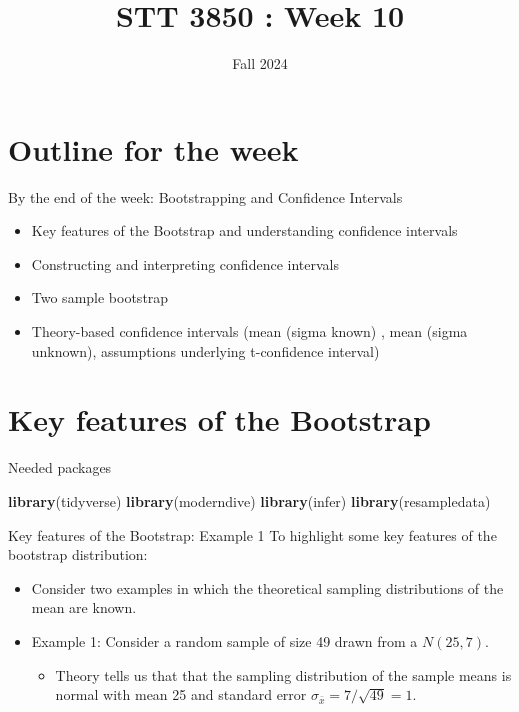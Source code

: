 \documentclass[
  ignorenonframetext,
]{beamer}
\title{STT 3850 : Week 10}
\author{Fall 2024}
\date{}
\institute{Appalachian State University}
\newenvironment{Shaded}{\begin{snugshade}}{\end{snugshade}}
\newcommand{\FunctionTok}[1]{\textcolor[rgb]{0.13,0.29,0.53}{\textbf{#1}}}
\newcommand{\NormalTok}[1]{#1}
\providecommand{\tightlist}{%
  \setlength{\itemsep}{0pt}\setlength{\parskip}{0pt}}
\begin{document}
\frame{\titlepage}

\hypertarget{outline-for-the-week}{%
\section{Outline for the week}\label{outline-for-the-week}}

\begin{frame}{By the end of the week: Bootstrapping and Confidence
Intervals}
\protect\hypertarget{by-the-end-of-the-week-bootstrapping-and-confidence-intervals}{}
\begin{itemize}
\item
  Key features of the Bootstrap and understanding confidence intervals
\item
  Constructing and interpreting confidence intervals
\item
  Two sample bootstrap
\item
  Theory-based confidence intervals (mean (sigma known) , mean (sigma
  unknown), assumptions underlying t-confidence interval)
\end{itemize}
\end{frame}

\hypertarget{key-features-of-the-bootstrap}{%
\section{Key features of the
Bootstrap}\label{key-features-of-the-bootstrap}}

\begin{frame}[fragile]{Needed packages}
\protect\hypertarget{needed-packages}{}
\small

\begin{Shaded}
\begin{Highlighting}[]
\FunctionTok{library}\NormalTok{(tidyverse)}
\FunctionTok{library}\NormalTok{(moderndive)}
\FunctionTok{library}\NormalTok{(infer)}
\FunctionTok{library}\NormalTok{(resampledata)}
\end{Highlighting}
\end{Shaded}

\normalsize
\end{frame}

\begin{frame}{Key features of the Bootstrap: Example 1}
\protect\hypertarget{key-features-of-the-bootstrap-example-1}{}
To highlight some key features of the bootstrap distribution:

\begin{itemize}
\item
  Consider two examples in which the theoretical sampling distributions
  of the mean are known.
\item
  Example 1: Consider a random sample of size 49 drawn from a
  \(N(25, 7)\).

  \begin{itemize}
  \tightlist
  \item
    Theory tells us that that the sampling distribution of the sample
    means is normal with mean 25 and standard error
    \(\sigma_{\bar{x}}=7/\sqrt{49}=1\).
  \end{itemize}
\end{itemize}
\end{frame}
\end{document}
